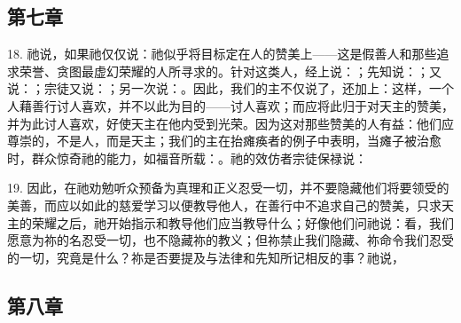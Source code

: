 
\subsection{第七章}

18. 祂说，如果祂仅仅说：祂似乎将目标定在人的赞美上——这是假善人和那些追求荣誉、贪图最虚幻荣耀的人所寻求的。针对这类人，经上说：；先知说：；又说：；宗徒又说：；另一次说：。因此，我们的主不仅说了，还加上：这样，一个人藉善行讨人喜欢，并不以此为目的——讨人喜欢；而应将此归于对天主的赞美，并为此讨人喜欢，好使天主在他内受到光荣。因为这对那些赞美的人有益：他们应尊崇的，不是人，而是天主；我们的主在抬瘫痪者的例子中表明，当瘫子被治愈时，群众惊奇祂的能力，如福音所载：。祂的效仿者宗徒保禄说：\par

19. 因此，在祂劝勉听众预备为真理和正义忍受一切，并不要隐藏他们将要领受的美善，而应以如此的慈爱学习以便教导他人，在善行中不追求自己的赞美，只求天主的荣耀之后，祂开始指示和教导他们应当教导什么；好像他们问祂说：看，我们愿意为祢的名忍受一切，也不隐藏祢的教义；但祢禁止我们隐藏、祢命令我们忍受的一切，究竟是什么？祢是否要提及与法律和先知所记相反的事？祂说，\par


\subsection{第八章}


